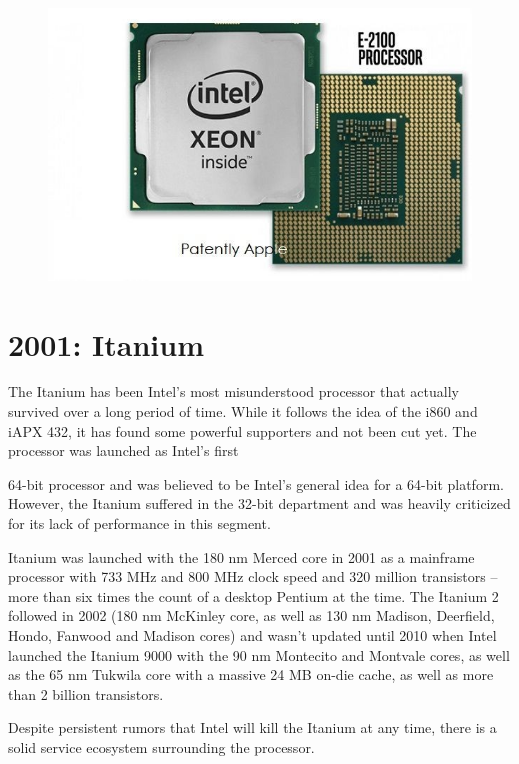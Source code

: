 \begin{figure}[ht!]
	\centering
\includegraphics[scale=0.5]{media/image21.jpeg}
\end{figure}

\hypertarget{itanium}{%
\section{2001: Itanium}\label{itanium}}

The Itanium has been Intel's most misunderstood processor that actually
survived over a long period of time. While it follows the idea of the
i860 and iAPX 432, it has found some powerful supporters and not been
cut yet. The processor was launched as Intel's first

64-bit processor and was believed to be Intel's general idea for a
64-bit platform. However, the Itanium suffered in the 32-bit department
and was heavily criticized for its lack of performance in this segment.

Itanium was launched with the 180 nm Merced core in 2001 as a mainframe
processor with 733 MHz and 800 MHz clock speed and 320 million
transistors -- more than six times the count of a desktop Pentium at the
time. The Itanium 2 followed in 2002 (180 nm McKinley core, as well as
130 nm Madison, Deerfield, Hondo, Fanwood and Madison cores) and wasn't
updated until 2010 when Intel launched the Itanium 9000 with the 90 nm
Montecito and Montvale cores, as well as the 65 nm Tukwila core with a
massive 24 MB on-die cache, as well as more than 2 billion transistors.

Despite persistent rumors that Intel will kill the Itanium at any time,
there is a solid service ecosystem surrounding the processor.

